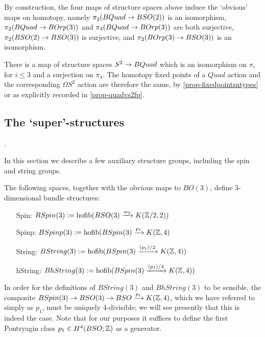 \documentclass{amsart}
\begin{document}
By construction, the four maps of structure spaces above induce the `obvious' maps on homotopy, namely $\pi_2(BQuad \rightarrow BSO(2))$ is an isomorphism, $\pi_2(BQuad \rightarrow BOrp(3))$ and $\pi_3(BQuad \rightarrow BOrp(3))$ are both surjective, $\pi_2(BSO(2) \rightarrow BSO(3))$ is surjective, and $\pi_2(BOrp(3) \rightarrow BSO(3))$ is an isomorphism.  

\begin{remark}
There is a map of structure spaces $S^2 \rightarrow BQuad$ which is an isomorphism on $\pi_i$ for $i \leq 3$ and a surjection on $\pi_4$.  The homotopy fixed points of a $Quad$ action and the corresponding $\Omega S^2$ action are therefore the same, by \cref{prop-fixedpointsntypes} or as explicitly recorded in \cref{prop-quadvs2fp}.
\end{remark}

\subsection{The `super'-structures}.


In this section we describe a few auxiliary structure groups, including the spin and string groups.

\begin{definition}
The following spaces, together with the obvious maps to $BO(3)$, define 3-dimensional bundle structures:
\begin{itemize}
\item[Spin:] $BSpin(3) := \operatorname{hofib}(BSO(3) \xrightarrow{w_2} K(\mathbb Z/2,2))$
\item[Spinp:] $BSpinp(3) := \operatorname{hofib}(BSpin(3) \xrightarrow{p_1} K(\mathbb Z,4)$
\item[String:] $BString(3) := \operatorname{hofib}(BSpin(3) \xrightarrow{(p_1)/2} K(\mathbb Z,4))$
\item[hString:] $BhString(3) := \operatorname{hofib}(BSpin(3) \xrightarrow{(p_1)/4} K(\mathbb Z,4))$
\end{itemize}
\end{definition}

\nid In order for the definitions of $BString(3)$ and $BhString(3)$ to be sensible, the composite $BSpin(3) \rightarrow BSO(3) \rightarrow BSO \xrightarrow{p_1} K(\mathbb Z,4)$, which we have referred to simply as $p_1$, must be uniquely 4-divisible; we will see presently that this is indeed the case.  Note that for our purposes it suffices to define the first Pontryagin class $p_1 \in H^4(BSO;\mathbb Z)$ as a generator.
\end{document}
